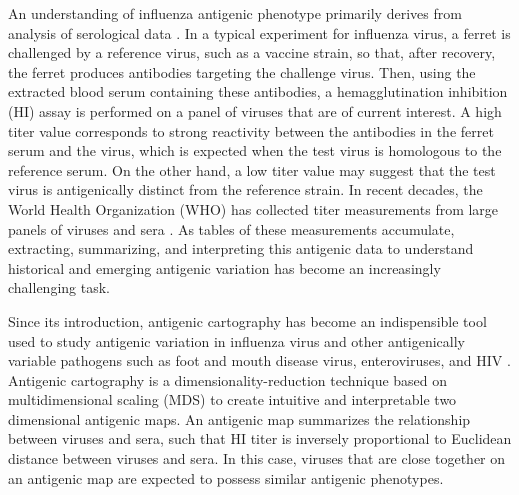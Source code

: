 \documentclass[11pt,oneside,letterpaper]{article}
\begin{document}
An understanding of influenza antigenic phenotype primarily derives from analysis of serological data \cite{smith_mapping_2004}. 
In a typical experiment for influenza virus, a ferret is challenged by a reference virus, such as a vaccine strain, so that, after recovery, the ferret produces antibodies targeting the challenge virus. 
Then, using the extracted blood serum containing these antibodies, a hemagglutination inhibition (HI) assay is performed on a panel of viruses that are of current interest. 
A high titer value corresponds to strong reactivity between the antibodies in the ferret serum and the virus, which is expected when the test virus is homologous to the reference serum.
On the other hand, a low titer value may suggest that the test virus is antigenically distinct from the reference strain. 
In recent decades, the World Health Organization (WHO) has collected titer measurements from large panels of viruses and sera \cite{smith_mapping_2004, russell_global_2008}. 
As tables of these measurements accumulate, extracting, summarizing, and interpreting this antigenic data to understand historical and emerging antigenic variation has become an increasingly challenging task. %

Since its introduction, antigenic cartography \cite{smith_mapping_2004, cai_computational_2010} has become an indispensible tool used to study antigenic variation in influenza virus and other antigenically variable pathogens such as foot and mouth disease virus, enteroviruses, and HIV \cite{smith_mapping_2004, jong_antigenic_2007, ludi_antigenic_2014, debbink_withinhost_2014, frost_mapping_2013}.
Antigenic cartography is a dimensionality-reduction technique based on multidimensional scaling (MDS) to create intuitive and interpretable two
dimensional antigenic maps. 
An antigenic map summarizes the relationship between viruses and sera, such that HI titer is inversely proportional to Euclidean distance between viruses and sera.
In this case, viruses that are close together on an antigenic map are expected to possess similar antigenic phenotypes. 
\end{document}
